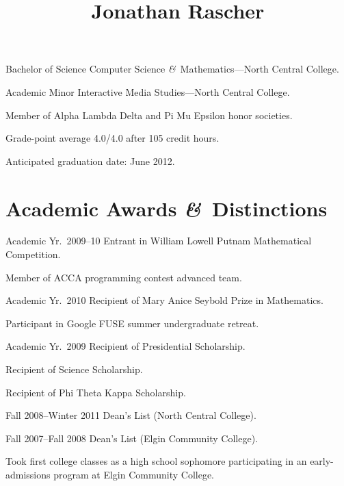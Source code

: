 \documentclass[11pt]{simplecv}
\newcommand*\amp{{\fertigopro\itshape\&}}
\begin{document}


  \title{Jonathan Rascher}
  \maketitle

  \begin{topic}
    \item[Bachelor of Science] Computer Science \amp\ Mathematics---North Central College.

    \item[Academic Minor] Interactive Media Studies---North Central College.

    \item[] Member of Alpha Lambda Delta and Pi Mu Epsilon honor societies.

    \item Grade-point average 4.0/4.0 after 105 credit hours.

    \item Anticipated graduation date: June 2012.
  \end{topic}

  \section{Academic Awards \amp\ Distinctions}
  \begin{topic}
    \item[Academic Yr.\ 2009--10] Entrant in William Lowell Putnam Mathematical Competition.

    Member of ACCA programming contest advanced team.

    \item[Academic Yr.\ 2010] Recipient of Mary Anice Seybold Prize in Mathematics.

    Participant in Google FUSE summer undergraduate retreat.

    \item[Academic Yr.\ 2009] Recipient of Presidential Scholarship.

    Recipient of Science Scholarship.

    Recipient of Phi Theta Kappa Scholarship.

    \item[Fall 2008--Winter 2011] Dean's List (North Central College).

    \item[Fall 2007--Fall 2008] Dean's List (Elgin Community College).

    \item Took first college classes as a high school sophomore participating in an early-admissions program at Elgin Community College.
  \end{topic}
\end{document}
